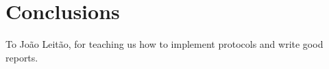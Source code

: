 \documentclass[sigconf]{acmart}
\begin{document}
\section{Conclusions}

\begin{acks}
    To João Leitão, for teaching us how to implement protocols and write good reports.
\end{acks}



\end{document}
